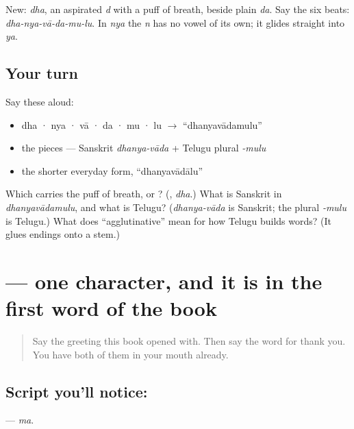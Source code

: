 \begin{sounds}
New:  \emph{dha}, an aspirated \emph{d} with a puff of breath, beside plain  \emph{da}. Say the six beats: \emph{dha-nya-vā-da-mu-lu}. In \emph{nya} the \emph{n} has no vowel of its own; it glides straight into \emph{ya}.
\end{sounds}

\subsection*{Your turn}
Say these aloud:

\begin{itemize}
\raggedright
  \item dha · nya · vā · da · mu · lu $\to$ \textquotedblleft{}dhanyavādamulu\textquotedblright{}
  \item the pieces — Sanskrit \emph{dhanya-vāda} + Telugu plural \emph{-mulu}
  \item the shorter everyday form, \textquotedblleft{}dhanyavādālu\textquotedblright{}
\end{itemize}

\begin{tcolorbox}[breakable,colback=teal!4,colframe=teal!35!black,title={Before you move on}]
Which carries the puff of breath, \textbf{} or \textbf{}? (\textbf{}, \emph{dha}.) What is Sanskrit in \emph{dhanyavādamulu}, and what is Telugu? (\emph{dhanya-vāda} is Sanskrit; the plural \emph{-mulu} is Telugu.) What does \textquotedblleft{}agglutinative\textquotedblright{} mean for how Telugu builds words? (It glues endings onto a stem.)
\end{tcolorbox}
\section[\texorpdfstring{\te{మ} (ma)}{మ (ma)}]{ — one character, and it is in the first word of the book}

\label{lesson:TE-S150-letter-ma}



\begin{quote}
Say the greeting this book opened with. Then say the word for thank you. You have both of them in your mouth already.
\end{quote}

\subsection*{Script you'll notice: }
\textbf{} — \emph{ma}.


